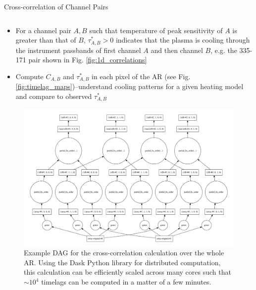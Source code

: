 \documentclass[final]{beamer}
\begin{document}
\begin{frame}
\begin{columns}[T]
\begin{column}{0.49\linewidth}
\begin{block}{Cross-correlation of Channel Pairs}
\begin{columns}[T]
\begin{column}{0.49\columnwidth}
\begin{itemize}
                    \item For a channel pair $A,B$ such that temperature of peak sensitivity of $A$ is greater than that of $B$, $\tau^*_{A,B}>0$ indicates that the plasma is \alert{cooling through} the instrument passbands of first channel $A$ and then channel $B$, e.g. the 335-171 pair shown in Fig. \ref{fig:1d_correlations}
                    \item Compute $C_{A,B}$ and $\tau^*_{A,B}$ in each pixel of the AR (see Fig. \ref{fig:timelag_maps})--understand cooling patterns for a given heating model and compare to observed $\tau^*_{A,B}$
                \end{itemize}
                \begin{figure}
                    \begin{columns}
                        \includegraphics[width=\columnwidth]{figures/timelag_dag.pdf}
                        \caption{Example DAG for the cross-correlation calculation over the whole AR. Using the Dask Python library \citep{dask_development_team_dask:_2016} for distributed computation, this calculation can be efficiently scaled across many cores such that $\sim10^4$ timelags can be computed in a matter of a few minutes.}
                    \end{columns}
                    \label{fig:timelag_dask_dag}
                \end{figure}
            \end{column}
        \end{columns}
    \end{block}

\end{column}
\end{columns}
\end{frame}
\end{document}
